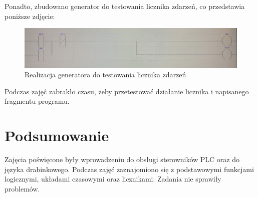 \documentclass[12pt]{article}
\begin{document}
Ponadto, zbudowano generator do testowania licznika zdarzeń, co przedstawia poniższe zdjęcie:
\begin{figure}[H]
    \centering
    \includegraphics[width=\textwidth]{licznik_zdj2.jpg}
    \caption{Realizacja generatora do testowania licznika zdarzeń}
\end{figure}

Podczas zajęć zabrakło czasu, żeby przetestować działanie licznika i napisanego fragmentu programu.


\section{Podsumowanie}
Zajęcia poświęcone były wprowadzeniu do obsługi sterowników PLC oraz do języka drabinkowego. Podczas zajęć zaznajomiono się z podstawowymi funkcjami logicznymi, układami czasowymi oraz licznikami. Zadania nie sprawiły problemów.
\end{document}
